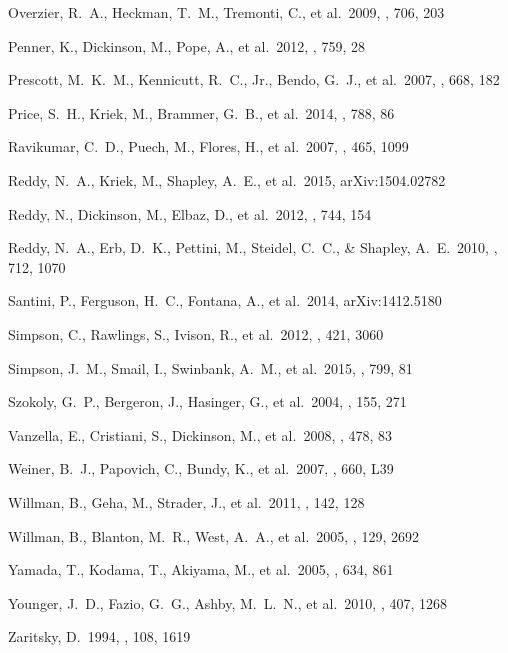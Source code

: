 \documentclass[preprint]{aastex}
\begin{document}
\begin{thebibliography}
 Overzier, R.~A., 
Heckman, T.~M., Tremonti, C., et al.\ 2009, \apj, 706, 203

 Penner, K., Dickinson, 
M., Pope, A., et al.\ 2012, \apj, 759, 28 

 Prescott, M.~K.~M., 
Kennicutt, R.~C., Jr., Bendo, G.~J., et al.\ 2007, \apj, 668, 182

 Price, S.~H., Kriek, M., 
Brammer, G.~B., et al.\ 2014, \apj, 788, 86

 Ravikumar, C.~D., Puech, M.,
Flores, H., et al.\ 2007, \aap, 465, 1099

 Reddy, N.~A., Kriek, M., 
Shapley, A.~E., et al.\ 2015, arXiv:1504.02782

 Reddy, N., Dickinson, M.,
Elbaz, D., et al.\ 2012, \apj, 744, 154 

 Reddy, N.~A., Erb, D.~K.,
Pettini, M., Steidel, C.~C., \& Shapley, A.~E.\ 2010, \apj, 712, 1070

 Santini, P., Ferguson, 
H.~C., Fontana, A., et al.\ 2014, arXiv:1412.5180

 Simpson, C., Rawlings, 
S., Ivison, R., et al.\ 2012, \mnras, 421, 3060

 Simpson, J.~M., Smail, 
I., Swinbank, A.~M., et al.\ 2015, \apj, 799, 81

 Szokoly, G.~P., 
Bergeron, J., Hasinger, G., et al.\ 2004, \apjs, 155, 271

 Vanzella, E., Cristiani, S.,
Dickinson, M., et al.\ 2008, \aap, 478, 83

 Weiner, B.~J., Papovich, 
C., Bundy, K., et al.\ 2007, \apjl, 660, L39

 Willman, B., Geha, M., 
Strader, J., et al.\ 2011, \aj, 142, 128 

 Willman, B., Blanton, 
M.~R., West, A.~A., et al.\ 2005, \aj, 129, 2692

 Yamada, T., Kodama, T., 
Akiyama, M., et al.\ 2005, \apj, 634, 861

 Younger, J.~D., Fazio, 
G.~G., Ashby, M.~L.~N., et al.\ 2010, \mnras, 407, 1268

 Zaritsky, D.\ 1994, \aj, 108, 
1619

\end{thebibliography}
\end{document}
